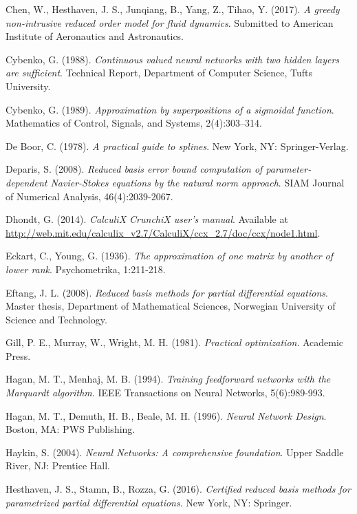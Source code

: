 \documentclass[longtitle]{elsarticle}
\numberwithin{equation}{section}
\theoremstyle{theorem}
\theoremstyle{definition}
\theoremstyle{remark}
\theoremstyle{proposition}
\numberwithin{figure}{section}
\begin{document}
\begin{thebibliography}{50}
		Chen, W., Hesthaven, J. S., Junqiang, B., Yang, Z., Tihao, Y. (2017). \emph{A greedy non-intrusive reduced order model for fluid dynamics}. Submitted to American Institute of Aeronautics and Astronautics.
	
		Cybenko, G. (1988). \emph{Continuous valued neural networks with two hidden layers are sufficient}. Technical Report, Department of Computer Science, Tufts University.
		
		Cybenko, G. (1989). \emph{Approximation by superpositions of a sigmoidal function}. Mathematics of Control, Signals, and Systems, 2(4):303–314.
		
		De Boor, C. (1978). \emph{A practical guide to splines}. New York, NY: Springer-Verlag.
		
		Deparis, S. (2008). \emph{Reduced basis error bound computation of parameter-dependent Navier-Stokes equations by the natural norm approach}. SIAM Journal of Numerical Analysis, 46(4):2039-2067.
		
		Dhondt, G. (2014). \emph{CalculiX CrunchiX user's manual}. Available at \url{http://web.mit.edu/calculix_v2.7/CalculiX/ccx_2.7/doc/ccx/node1.html}.
		
		Eckart, C., Young, G. (1936). \emph{The approximation of one matrix by another of lower rank}. Psychometrika, 1:211-218.
		
		Eftang, J. L. (2008). \emph{Reduced basis methods for partial differential equations}. Master thesis, Department of Mathematical Sciences, Norwegian University of Science and Technology.
		
		\textcolor{deepgreen}{
			Gill, P. E., Murray, W., Wright, M. H. (1981). \emph{Practical optimization}. Academic Press.
		}

		Hagan, M. T., Menhaj, M. B. (1994). \emph{Training feedforward networks with the Marquardt algorithm}. IEEE Transactions on Neural Networks, 5(6):989-993.
		
		Hagan, M. T., Demuth, H. B., Beale, M. H. (1996). \emph{Neural Network Design}. Boston, MA: PWS Publishing.		

		Haykin, S. (2004). \emph{Neural Networks: A comprehensive foundation}. Upper Saddle River, NJ: Prentice Hall.
		
		Hesthaven, J. S., Stamn, B., Rozza, G. (2016). \emph{Certified reduced basis methods for parametrized partial differential equations}. New York, NY: Springer.
		

\end{thebibliography}
\end{document}
